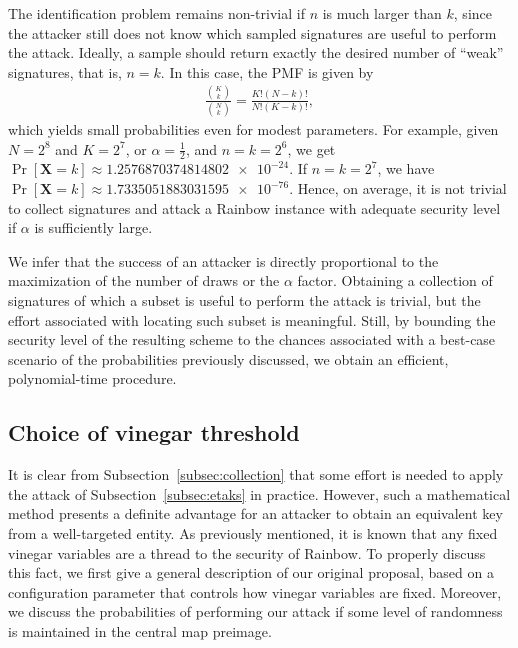 \documentclass[english]{ufsc-thesis-rn46-2019/ufsc-thesis-rn46-2019}
\theoremstyle{definition}
\begin{document}
The identification problem remains non-trivial if $n$ is much larger than $k$,
since the attacker still does not know which sampled signatures are useful to
perform the attack. Ideally, a sample should return exactly the desired number
of ``weak'' signatures, that is, $n = k$. In this case, the PMF is given by
\begin{align*}
  \frac{\binom{K}{k}}{\binom{N}{k}} = \frac{K! (N - k)!}{N! (K - k)!},
\end{align*}
which yields small probabilities even for modest parameters. For example, given
$N = 2^{8}$ and $K = 2^{7}$, or $\alpha = \frac{1}{2}$, and $n = k = 2^{6}$, we
get
$\Pr[\mathbf{X} = k]
  \approx \num[round-mode=places,round-precision=4]{1.2576870374814802e-24}$.
If $n = k = 2^{7}$, we have
$\Pr[\mathbf{X} = k]
  \approx \num[round-mode=places,round-precision=4]{1.7335051883031595e-76}$.
Hence, on average, it is not trivial to collect signatures and attack a Rainbow
instance with adequate security level if $\alpha$ is sufficiently large.

We infer that the success of an attacker is directly proportional to the
maximization of the number of draws or the $\alpha$ factor. Obtaining
a collection of signatures of which a subset is useful to perform the attack is
trivial, but the effort associated with locating such subset is
meaningful. Still, by bounding the security level of the resulting scheme to
the chances associated with a best-case scenario of the probabilities
previously discussed, we obtain an efficient, polynomial-time procedure.

\subsection{Choice of vinegar threshold}\label{subsec:threshold}

It is clear from Subsection~\ref{subsec:collection} that some effort is needed
to apply the attack of Subsection~\ref{subsec:etaks} in practice. However, such
a mathematical method presents a definite advantage for an attacker to obtain
an equivalent key from a well-targeted entity. As previously mentioned, it is
known that any fixed vinegar variables are a thread to the security of
Rainbow. To properly discuss this fact, we first give a general description of
our original proposal, based on a configuration parameter that controls how
vinegar variables are fixed. Moreover, we discuss the probabilities of
performing our attack if some level of randomness is maintained in the central
map preimage.
\end{document}
